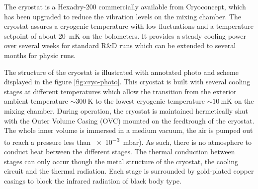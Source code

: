 The cryostat is a Hexadry-200 commercially available from Cryoconcept, which has been upgraded to reduce the vibration levels on the mixing chamber.
The cryostat assures a cryogenic temperature with low fluctuations and a temperature setpoint of about \SI{20}{\milli\kelvin} on the bolometers. It provides a steady cooling power over several weeks for standard R\&D runs which can be extended to several months for physic runs.

The structure of the cryostat is illustrated with annotated photo and scheme displayed in the figure \ref{fig:cryo-photo}. This cryostat is built with several cooling stages at different temperatures which allow the transition from the exterior ambient temperature $\sim \SI{300}{\kelvin}$ to the lowest cryogenic temperature $\sim \SI{10}{\milli\kelvin}$ on the mixing chamber. During operation, the cryostat is maintained hermetically shut with the Outer Volume Casing (OVC) mounted on the feedtrough of the cryostat. The whole inner volume is immersed in a medium vacuum, the air is pumped out to reach a pressure less than \SI{e-3}{\milli\bar}). As such, there is no atmosphere to conduct heat between the different stages. The thermal conduction between stages can only occur though the metal structure of the cryostat, the cooling circuit and the thermal radiation. Each stage is surrounded by gold-plated copper casings to block the infrared radiation of black body type.


